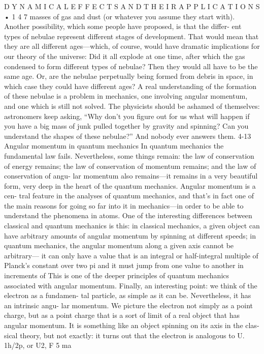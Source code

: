 \documentclass[10pt,oneside]{article}
\begin{document}
D Y N A M I C A L  E F F E C T S  A N D  T H E I R  A P P L I C A T I O N S • 1 4 7 masses of gas and dust (or whatever you assume they start with). Another possibility, which some people have proposed, is that the differ- ent types of nebulae represent different stages of development. That would mean that they are all different ages---which, of course, would have dramatic implications for our theory of the universe: Did it all explode at one time, after which the gas condensed to form different types of nebulae? Then they would all have to be the same age. Or, are the nebulae perpetually being formed from debris in space, in which case they could have different ages? A real understanding of the formation of these nebulae is a problem in mechanics, one involving angular momentum, and one which is still not solved. The physicists should be ashamed of themselves: astronomers keep asking, “Why don’t you figure out for us what will happen if you have a big mass of junk pulled together by gravity and spinning? Can you understand the shapes of these nebulae?” And nobody ever answers them. 4-13 Angular momentum in quantum mechanics In quantum mechanics the fundamental law fails. Nevertheless, some things remain: the law of conservation of energy remains; the law of conservation of momentum remains; and the law of conservation of angu- lar momentum also remains---it remains in a very beautiful form, very deep in the heart of the quantum mechanics. Angular momentum is a cen- tral feature in the analyses of quantum mechanics, and that’s in fact one of the main reasons for going so far into it in mechanics---in order to be able to understand the phenomena in atoms. One of the interesting differences between classical and quantum mechanics is this: in classical mechanics, a given object can have arbitrary amounts of angular momentum by spinning at different speeds; in quantum mechanics, the angular momentum along a given axis cannot be arbitrary--- it can only have a value that is an integral or half-integral multiple of Planck’s constant over two pi and it must jump from one value to another in increments of This is one of the deeper principles of quantum mechanics associated with angular momentum. Finally, an interesting point: we think of the electron as a fundamen- tal particle, as simple as it can be. Nevertheless, it has an intrinsic angu- lar momentum. We picture the electron not simply as a point charge, but as a point charge that is a sort of limit of a real object that has angular momentum. It is something like an object spinning on its axis in the clas- sical theory, but not exactly: it turns out that the electron is analogous to U. 1h/2p, or U2, F 5 ma\par
\end{document}
